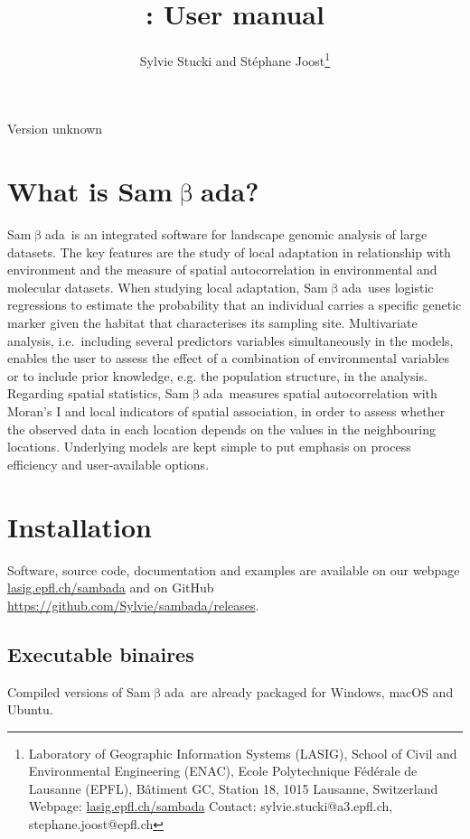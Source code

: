\documentclass[a4paper,11pt]{article}
\date{ \printdate{\releasedate} }
\title{\smb: User manual}
\author{Sylvie Stucki and Stéphane Joost\footnote{
Laboratory of Geographic Information Systems (LASIG), School of Civil and Environmental Engineering (ENAC), Ecole Polytechnique Fédérale de Lausanne (EPFL), Bâtiment GC, Station 18, 1015 Lausanne, Switzerland \newline
Webpage: \protect\url{lasig.epfl.ch/sambada} \newline Contact: sylvie.stucki@a3.epfl.ch, stephane.joost@epfl.ch
}}
\newcommand{\versionnumber}{unknown}
\newcommand{\smb}{\textsf{Sam$\upbeta$ada}}
\newcommand{\smbtitre}{\protect\texorpdfstring{\smb}{Samßada}}
\begin{document}
\maketitle

\vspace{-1.25cm}
\begin{center}
\small Version \versionnumber
\end{center}

\vfill

\tableofcontents

\vfill

\clearpage

\section{What is \smbtitre?}

\smb\ is an integrated software for landscape genomic analysis of large datasets. 
The key features are the study of local adaptation in relationship with environment and the measure of spatial autocorrelation in environmental and molecular datasets.
When studying local adaptation, \smb\ uses logistic regressions to estimate the probability that an individual carries a specific genetic marker given the habitat that characterises its sampling site.
Multivariate analysis, i.e.~including several predictors variables simultaneously in the models, enables the user to assess the effect of a combination of environmental variables or to include prior knowledge, e.g. the population structure, in the analysis.
Regarding spatial statistics, \smb\ measures spatial autocorrelation with Moran's I and local indicators of spatial association, in order to assess whether the observed data in each location depends on the values in the neighbouring locations.
Underlying models are kept simple to put emphasis on process efficiency and user-available options.



\section{Installation}
Software, source code, documentation and examples are available on our webpage \url{lasig.epfl.ch/sambada} and on GitHub \url{https://github.com/Sylvie/sambada/releases}.

\subsection*{Executable binaires}
Compiled versions of \smb\ are already packaged for Windows, macOS and Ubuntu.
\end{document}
